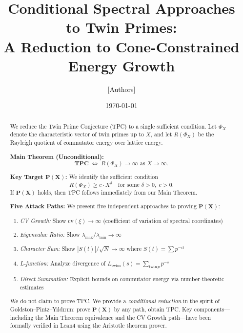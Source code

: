 \documentclass[11pt,a4paper]{article}
\title{Conditional Spectral Approaches to Twin Primes:\\
A Reduction to Cone-Constrained Energy Growth}
\author{[Authors]}
\date{\today}
\begin{document}
\maketitle

\begin{abstract}
We reduce the Twin Prime Conjecture (TPC) to a single sufficient condition.
Let $\Phi_X$ denote the characteristic vector of twin primes up to $X$,
and let $R(\Phi_X)$ be the Rayleigh quotient of commutator energy over lattice energy.

\textbf{Main Theorem (Unconditional):}
\[
    \textbf{TPC} \;\iff\; R(\Phi_X) \to \infty \text{ as } X \to \infty.
\]

\textbf{Key Target $\mathbf{P(X)}$:} We identify the sufficient condition
\[
    R(\Phi_X) \geq c \cdot X^\delta \quad \text{for some } \delta > 0, \; c > 0.
\]
If $\mathbf{P(X)}$ holds, then TPC follows immediately from our Main Theorem.

\textbf{Five Attack Paths:} We present five independent approaches to proving $\mathbf{P(X)}$:
\begin{enumerate}[nosep]
    \item \emph{CV Growth:} Show $\mathrm{cv}(\xi) \to \infty$ (coefficient of variation of spectral coordinates)
    \item \emph{Eigenvalue Ratio:} Show $\lambda_{\max}/\lambda_{\min} \to \infty$
    \item \emph{Character Sum:} Show $|S(t)|/\sqrt{N} \to \infty$ where $S(t) = \sum p^{-it}$
    \item \emph{L-function:} Analyze divergence of $L_{\mathrm{twins}}(s) = \sum_{\mathrm{twin}\, p} p^{-s}$
    \item \emph{Direct Summation:} Explicit bounds on commutator energy via number-theoretic estimates
\end{enumerate}

We do not claim to prove TPC. We provide a \emph{conditional reduction} in the spirit of
Goldston--Pintz--Y{\i}ld{\i}r{\i}m: prove $\mathbf{P(X)}$ by any path, obtain TPC.
Key components---including the Main Theorem equivalence and the CV Growth path---have been
formally verified in Lean4 using the Aristotle theorem prover.
\end{abstract}


\end{document}
